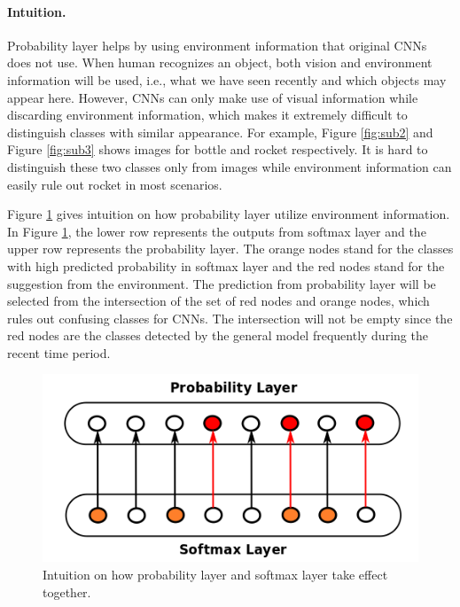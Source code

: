 \documentclass[pageno]{jpaper}
\begin{document}
\paragraph{Intuition.}
Probability layer helps by using environment information that original CNNs does not use. When human recognizes an object, both vision and environment information will be used, i.e., what we have seen recently and which objects may appear here. However, CNNs can only make use of visual information while discarding environment information, which makes it extremely difficult to distinguish classes with similar appearance. For example, Figure \ref{fig:sub2} and Figure \ref{fig:sub3} shows images for bottle and rocket respectively. It is hard to distinguish these two classes only from images while environment information can easily rule out rocket in most scenarios. 

Figure \ref{fig:intuition} gives intuition on how probability layer utilize environment information. In Figure \ref{fig:intuition}, the lower row represents the outputs from softmax layer and the upper row represents the probability layer. The orange nodes stand for the classes with high predicted probability in softmax layer and the red nodes stand for the suggestion from the environment. The prediction from probability layer will be selected from the intersection of the set of red nodes and orange nodes, which rules out confusing classes for CNNs. The intersection will not be empty since the red nodes are the classes detected by the general model frequently during the recent time period.


\begin{figure}
  \centering
  \includegraphics[width=.45\textwidth]{intuition.png}
\caption{Intuition on how probability layer and softmax layer take effect together.}
  \label{fig:intuition}

\end{figure}
\end{document}
